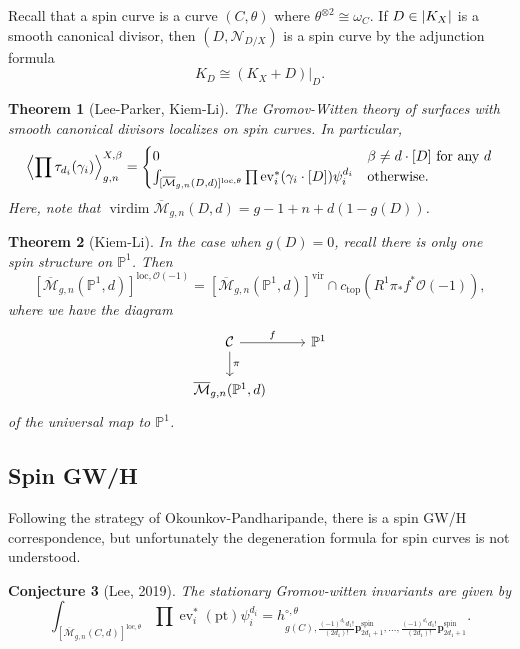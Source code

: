 \documentclass[leqno, openany]{memoir}
\newtheorem{thm}{Theorem}[section]
\newtheorem{conj}[thm]{Conjecture}
\theoremstyle{definition}
\theoremstyle{remark}
\theoremstyle{plain}
\theoremstyle{definition}
\theoremstyle{remark}
\renewcommand{\P}{\mathbb{P}}
\newcommand{\mc}[1]{\mathcal{#1}}
\newcommand{\mr}[1]{\mathrm{#1}}
\newcommand{\on}[1]{\operatorname{#1}}
\newcommand{\ol}[1]{\overline{#1}}
\begin{document}
Recall that a spin curve is a curve $(C, \theta)$ where $\theta^{\otimes 2} \cong \omega_C$. If $D \in \abs{K_X}$ is a smooth canonical divisor, then $(D, \mc{N}_{D/X})$ is a spin curve by the adjunction formula
\[ K_D \cong (K_X+D)|_D. \]
\begin{thm}[Lee-Parker, Kiem-Li]
  The Gromov-Witten theory of surfaces with smooth canonical divisors localizes on spin curves. In particular,
  \[ \ev{\prod \tau_{d_i}(\gamma_i)}_{g,n}^{X,\beta} = \begin{cases}
                                                         0 & \beta \neq d \cdot [D] \text{ for any }d \\
                                                         \int_{[\ol{\mc{M}}_{g,n}(D,d)]^{\mr{loc},\theta}} \prod \on{ev}_i^*(\gamma_i \cdot [D]) \psi_i^{d_i} & \text{otherwise}.
                                                       \end{cases} \]
  Here, note that $\on{virdim} \ol{\mc{M}}_{g,n}(D,d) = g-1+n+d(1-g(D))$.
\end{thm}

\begin{thm}[Kiem-Li]
  In the case when $g(D) = 0$, recall there is only one spin structure on $\P^1$. Then
  \[ [\ol{\mc{M}}_{g,n}(\P^1,d)]^{\mr{loc}, \mc{O}(-1)} = [\ol{\mc{M}}_{g,n}(\P^1, d)]^{\mr{vir}} \cap c_{\mr{top}}(R^1\pi_* f^* \mc{O}(-1)), \]
  where we have the diagram
  \begin{equation*}
    \begin{tikzcd}
      \mc{C} \ar{r}{f} \ar{d}{\pi} & \P^1 \\
      \ol{\mc{M}}_{g,n}(\P^1, d)
    \end{tikzcd}
  \end{equation*}
  of the universal map to $\P^1$.
\end{thm}

\subsection{Spin GW/H}
\label{subsec:spingwh}

Following the strategy of Okounkov-Pandharipande, there is a spin GW/H correspondence, but unfortunately the degeneration formula for spin curves is not understood.

\begin{conj}[Lee, 2019]\label{conj:stationary}
  The stationary Gromov-witten invariants are given by
  \[ \int_{[\ol{\mc{M}}_{g,n}(C,d)]^{\mr{loc},\theta}} \prod \on{ev}_i^*(\mr{pt}) \psi_i^{d_i} = h^{\circ, \theta}_{g(C),\frac{(-1)^{d_1} d_1!}{(2d_1)!} \mathbf{p}_{2d_1+1}^{\mr{spin}}, \ldots, \frac{(-1)^{d_1} d_1!}{(2d_1)!} \mathbf{p}_{2d_1+1}^{\mr{spin}}}. \]
\end{conj}
\end{document}
